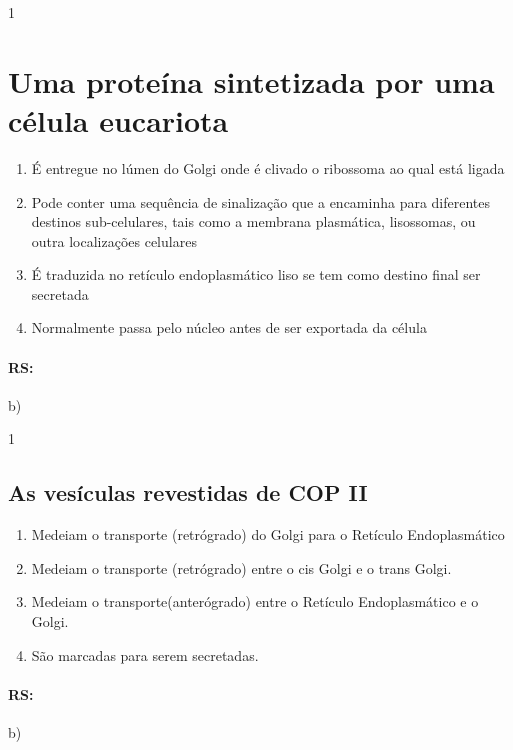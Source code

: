 \documentclass[\mainfilename]{subfiles}
\begin{document}
\begin{questionBox}1{} %
    
    \section*{Uma proteína sintetizada por uma célula eucariota}
    \begin{enumerate}[label=\alph{enumi})]
        \item É entregue no lúmen do Golgi onde é clivado o ribossoma ao qual está ligada
        \item Pode conter uma sequência de sinalização que a encaminha para diferentes destinos sub-celulares, tais como a membrana plasmática, lisossomas, ou outra localizações celulares
        \item É traduzida no retículo endoplasmático liso se tem como destino final ser secretada 
        \item Normalmente passa pelo núcleo antes de ser exportada da célula
    \end{enumerate}

    \paragraph*{RS:} b)

\end{questionBox}

\begin{questionBox}1{} %
    
    \subsection*{As vesículas revestidas de COP II}
    \begin{enumerate}[label=\alph{enumi})]
        \item Medeiam o transporte (retrógrado) do Golgi para o Retículo Endoplasmático
        \item Medeiam o transporte (retrógrado) entre o cis Golgi e o trans Golgi.
        \item Medeiam o transporte(anterógrado) entre o Retículo Endoplasmático e o Golgi. 
        \item São marcadas para serem secretadas.
    \end{enumerate}

    \paragraph*{RS:} b)
    
\end{questionBox}
\end{document}

